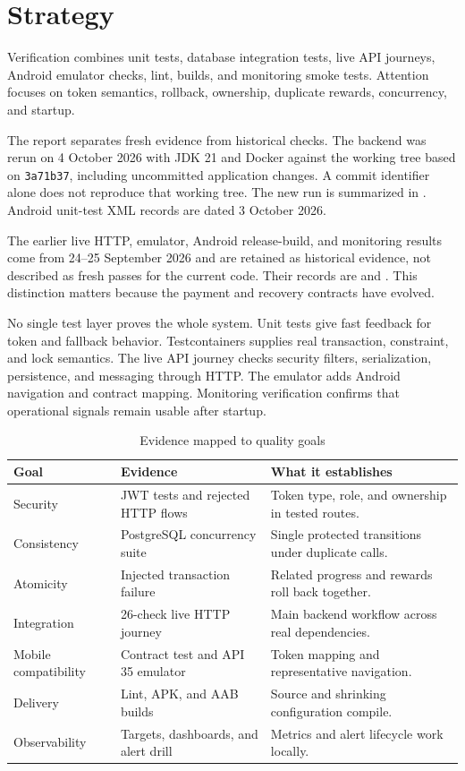 \documentclass[12pt,a4paper,oneside]{report}
\newcommand{\verificationdate}{4 October 2026}
\begin{document}
\section{Strategy}
Verification combines unit tests, database integration tests, live API journeys,
Android emulator checks, lint, builds, and monitoring smoke tests. Attention focuses
on token semantics, rollback, ownership, duplicate rewards, concurrency, and startup.

The report separates fresh evidence from historical checks. The backend was rerun on
\verificationdate{} with JDK 21 and Docker against the working tree based on
\texttt{3a71b37}, including uncommitted application changes. A commit identifier alone
does not reproduce that working tree. The new run is summarized in
. Android unit-test XML records are dated 3 October 2026.

The earlier live HTTP, emulator, Android release-build, and monitoring results come
from 24--25 September 2026 and are retained as historical evidence, not described as
fresh passes for the current code. Their records are
 and .
This distinction matters because the payment and recovery contracts have evolved.

No single test layer proves the whole system. Unit tests give fast feedback for token
and fallback behavior. Testcontainers supplies real transaction, constraint, and lock
semantics. The live API journey checks security filters, serialization, persistence,
and messaging through HTTP. The emulator adds Android navigation and contract mapping.
Monitoring verification confirms that operational signals remain usable after startup.

\begin{table}[H]\centering
\caption{Evidence mapped to quality goals}\label{tab:evidence}
\begin{tabular}{P{0.25\textwidth}P{0.32\textwidth}P{0.32\textwidth}}\toprule
\textbf{Goal} & \textbf{Evidence} & \textbf{What it establishes}\\\midrule
Security & JWT tests and rejected HTTP flows & Token type, role, and ownership in tested routes.\\
Consistency & PostgreSQL concurrency suite & Single protected transitions under duplicate calls.\\
Atomicity & Injected transaction failure & Related progress and rewards roll back together.\\
Integration & 26-check live HTTP journey & Main backend workflow across real dependencies.\\
Mobile compatibility & Contract test and API 35 emulator & Token mapping and representative navigation.\\
Delivery & Lint, APK, and AAB builds & Source and shrinking configuration compile.\\
Observability & Targets, dashboards, and alert drill & Metrics and alert lifecycle work locally.\\
\bottomrule\end{tabular}
\end{table}
\end{document}
